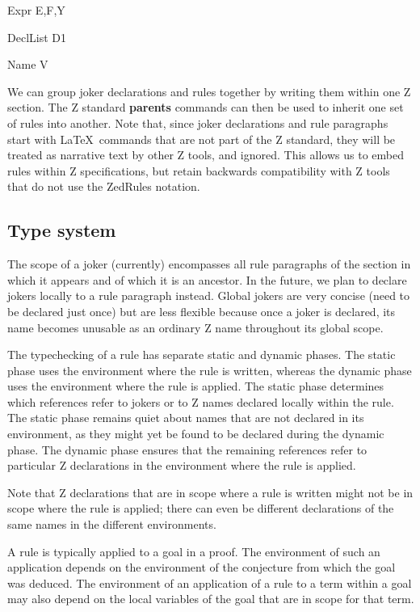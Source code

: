\documentclass{entcs}
\begin{document}
\begin{zedjoker}{Expr} E,F,Y \end{zedjoker}
\begin{zedjoker}{DeclList} D1 \end{zedjoker}
\begin{zedjoker}{Name} V \end{zedjoker}

We can group joker declarations and rules together by writing them
within one Z section.  The Z standard \textbf{parents} commands can
then be used to inherit one set of rules into another.  Note that,
since joker declarations and rule paragraphs start with \LaTeX\
commands that are not part of the Z standard, they will be treated as
narrative text by other Z tools, and ignored.  This allows us to embed
rules within Z specifications, but retain backwards compatibility with
Z tools that do not use the ZedRules notation.

\subsection{Type system}

The scope of a joker (currently) encompasses all rule paragraphs of
the section in which it appears and of which it is an ancestor.  In
the future, we plan to declare jokers locally to a rule paragraph
instead.  Global jokers are very concise (need to be declared just
once) but are less flexible because once a joker is declared, its name
becomes unusable as an ordinary Z name throughout its global scope.

The typechecking of a rule has separate static and dynamic phases.
The static phase uses the environment where the rule is written,
whereas the dynamic phase uses the environment where the rule is
applied.  The static phase determines which references refer to jokers
or to Z names declared locally within the rule.  The static phase
remains quiet about names that are not declared in its environment, as
they might yet be found to be declared during the dynamic phase.  The
dynamic phase ensures that the remaining references refer to
particular Z declarations in the environment where the rule is
applied.

Note that Z declarations that are in scope where a rule is written
might not be in scope where the rule is applied; there can even be
different declarations of the same names in the different
environments.

A rule is typically applied to a goal in a proof.  The environment of
such an application depends on the environment of the conjecture from
which the goal was deduced.  The environment of an application of a
rule to a term within a goal may also depend on the local variables of
the goal that are in scope for that term.
\end{document}

